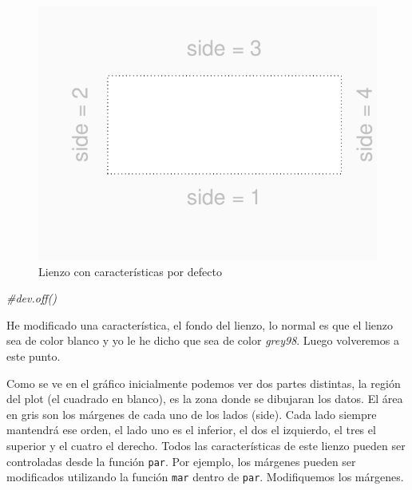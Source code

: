 \documentclass[]{article}
\newenvironment{Shaded}{\begin{snugshade}}{\end{snugshade}}
\newcommand{\CommentTok}[1]{\textcolor[rgb]{0.56,0.35,0.01}{\textit{{#1}}}}
\begin{document}
\begin{figure}

{\centering \includegraphics{index_files/figure-latex/unnamed-chunk-2-1} 

}

\caption{Lienzo con características por defecto}\label{fig:unnamed-chunk-2}
\end{figure}

\begin{Shaded}
\begin{Highlighting}[]
\CommentTok{#dev.off()}
\end{Highlighting}
\end{Shaded}

He modificado una característica, el fondo del lienzo, lo normal es que
el lienzo sea de color blanco y yo le he dicho que sea de color
\emph{grey98}. Luego volveremos a este punto.

Como se ve en el gráfico inicialmente podemos ver dos partes distintas,
la región del plot (el cuadrado en blanco), es la zona donde se
dibujaran los datos. El área en gris son los márgenes de cada uno de los
lados (side). Cada lado siempre mantendrá ese orden, el lado uno es el
inferior, el dos el izquierdo, el tres el superior y el cuatro el
derecho. Todos las características de este lienzo pueden ser controladas
desde la función \texttt{par}. Por ejemplo, los márgenes pueden ser
modificados utilizando la función \texttt{mar} dentro de \texttt{par}.
Modifiquemos los márgenes.
\end{document}

